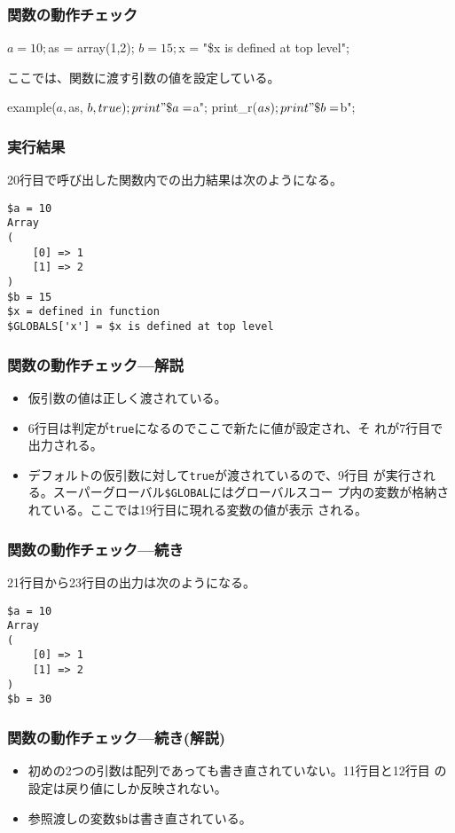 \documentclass[dvipsk]{beamer}
\begin{document}
\begin{frame}[containsverbatim]
\frametitle{関数の動作チェック}
\begin{listingcont}
$a = 10;
$as = array(1,2);
$b = 15;
$x = "\$x is defined at top level";
\end{listingcont}
ここでは、関数に渡す引数の値を設定している。
\begin{listingcont}
example($a, $as, $b, true);
print "\$a = $a\n";
print_r($as);
print "\$b = $b\n";
\end{listingcont}
\end{frame}
\begin{frame}[containsverbatim]
 \frametitle{実行結果}
 20行目で呼び出した関数内での出力結果は次のようになる。
\begin{verbatim}
$a = 10
Array
(
    [0] => 1
    [1] => 2
)
$b = 15
$x = defined in function
$GLOBALS['x'] = $x is defined at top level
\end{verbatim}
\end{frame}
\begin{frame}[containsverbatim]
\frametitle{関数の動作チェック---解説}
\begin{itemize}
 \item 仮引数の値は正しく渡されている。
 \item 6行目は判定が\texttt{true}になるのでここで新たに値が設定され、そ
       れが7行目で出力される。
 \item デフォルトの仮引数に対して\texttt{true}が渡されているので、9行目
       が実行される。スーパーグローバル\verb+$GLOBAL+にはグローバルスコー
       プ内の変数が格納されている。ここでは19行目に現れる変数の値が表示
       される。
\end{itemize}
\end{frame}
\begin{frame}[containsverbatim]
\frametitle{関数の動作チェック---続き}
21行目から23行目の出力は次のようになる。
\begin{verbatim}
$a = 10
Array
(
    [0] => 1
    [1] => 2
)
$b = 30
\end{verbatim}
\end{frame}
\begin{frame}[containsverbatim]
\frametitle{関数の動作チェック---続き(解説)}
\begin{itemize}
 \item 初めの2つの引数は配列であっても書き直されていない。11行目と12行目
       の設定は戻り値にしか反映されない。
 \item 参照渡しの変数\verb+$b+は書き直されている。
\end{itemize}
\end{frame}
\end{document}
